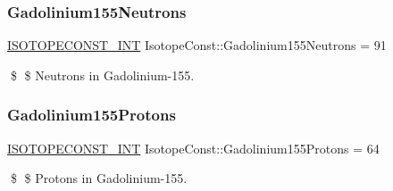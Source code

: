 \subsubsection{\texorpdfstring{Gadolinium155\+Neutrons}{Gadolinium155Neutrons}}
{\footnotesize\ttfamily \mbox{\hyperlink{group___isotope_const-_macros_ga5f18360b3e99483a35c32d789e62621c}{I\+S\+O\+T\+O\+P\+E\+C\+O\+N\+S\+T\+\_\+\+I\+NT}} Isotope\+Const\+::\+Gadolinium155\+Neutrons = 91}

\$ \$ Neutrons in Gadolinium-\/155. \mbox{\label{group___isotope_const-_gadolinium-_gd155_ga7348f16fd6262a8fcc429d91ec10a396}} 
\subsubsection{\texorpdfstring{Gadolinium155\+Protons}{Gadolinium155Protons}}
{\footnotesize\ttfamily \mbox{\hyperlink{group___isotope_const-_macros_ga5f18360b3e99483a35c32d789e62621c}{I\+S\+O\+T\+O\+P\+E\+C\+O\+N\+S\+T\+\_\+\+I\+NT}} Isotope\+Const\+::\+Gadolinium155\+Protons = 64}

\$ \$ Protons in Gadolinium-\/155. 